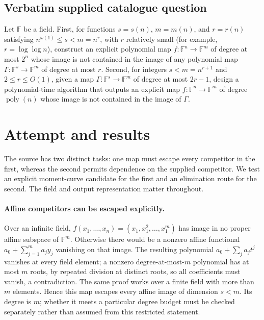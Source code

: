 \documentclass[11pt]{article}
\begin{document}
\subsection{Verbatim supplied catalogue question}
Let $\mathbb{F}$ be a field. First, for functions $s=s(n)$, $m=m(n)$, and $r=r(n)$ satisfying $n^{\omega(1)}\leq s<m=n^r$, with $r$ relatively small (for example, $r=\log\log n$), construct an explicit polynomial map $f:\mathbb{F}^n\to\mathbb{F}^m$ of degree at most $2^n$ whose image is not contained in the image of any polynomial map $\Gamma:\mathbb{F}^s\to\mathbb{F}^m$ of degree at most $r$. Second, for integers $s<m=n^{r+1}$ and $2\leq r\leq O(1)$, given a map $\Gamma:\mathbb{F}^s\to\mathbb{F}^m$ of degree at most $2r-1$, design a polynomial-time algorithm that outputs an explicit map $f:\mathbb{F}^n\to\mathbb{F}^m$ of degree $\operatorname{poly}(n)$ whose image is not contained in the image of $\Gamma$.

\section{Attempt and results}
The source has two distinct tasks: one map must escape every competitor in
the first, whereas the second permits dependence on the supplied competitor.
We test an explicit moment-curve candidate for the first and an elimination
route for the second. The field and output representation matter throughout.

\paragraph{Affine competitors can be escaped explicitly.}
Over an infinite field, $f(x_1,\ldots,x_n)=(x_1,x_1^2,\ldots,x_1^m)$ has
image in no proper affine subspace of $\mathbb F^m$. Otherwise there would
be a nonzero affine functional $a_0+\sum_{j=1}^m a_j y_j$ vanishing on
that image. The resulting polynomial $a_0+\sum_j a_j t^j$ vanishes at
every field element; a nonzero degree-at-most-$m$ polynomial has at most $m$
roots, by repeated division at distinct roots, so all coefficients must vanish,
a contradiction. The same proof works over a finite field with more than $m$
elements. Hence this map escapes every affine image of dimension $s<m$.
Its degree is $m$; whether it meets a particular degree budget must be checked
separately rather than assumed from this restricted statement.
\end{document}
